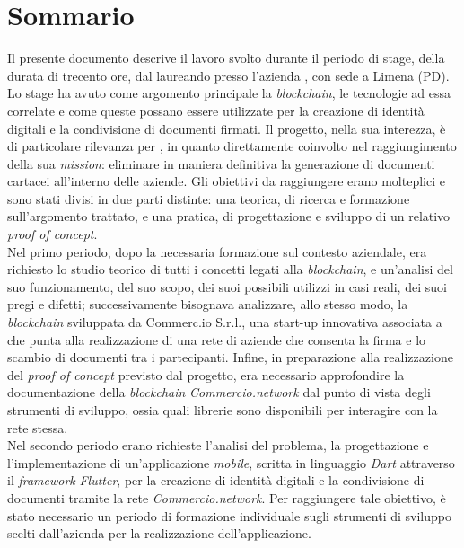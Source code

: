 
\cleardoublepage
{}
{}
\begingroup
\let\clearpage\relax
\let\cleardoublepage\relax
\let\cleardoublepage\relax

\chapter*{Sommario}

Il presente documento descrive il lavoro svolto durante il periodo di stage, della durata di trecento ore, dal laureando \myName{} presso l'azienda \myCompany{} \companyTitle{}, con sede a Limena (PD).\\
Lo stage ha avuto come argomento principale la \textit{blockchain}, le tecnologie ad essa correlate e come queste possano essere utilizzate per la creazione di identità digitali e la condivisione di documenti firmati. Il progetto, nella sua interezza, è di particolare rilevanza per \myCompany{} \companyTitle{}, in quanto direttamente coinvolto nel raggiungimento della sua \textit{mission}: eliminare in maniera definitiva la generazione di documenti cartacei all'interno delle aziende.
Gli obiettivi da raggiungere erano molteplici e sono stati divisi in due parti distinte: una teorica, di ricerca e formazione sull'argomento trattato, e una pratica, di progettazione e sviluppo di un relativo \textit{proof of concept}.\\
Nel primo periodo, dopo la necessaria formazione sul contesto aziendale, era richiesto lo studio teorico di tutti i concetti legati alla \textit{blockchain}, e un'analisi del suo funzionamento, del suo scopo, dei suoi possibili utilizzi in casi reali, dei suoi pregi e difetti; successivamente bisognava analizzare, allo stesso modo, la \textit{blockchain} sviluppata da Commerc.io S.r.l., una start-up innovativa associata a \myCompany{} \companyTitle{} che punta alla realizzazione di una rete di aziende che consenta la firma e lo scambio di documenti tra i partecipanti. Infine, in preparazione alla realizzazione del \textit{proof of concept} previsto dal progetto, era necessario approfondire la documentazione della \textit{blockchain} \textit{Commercio.network} dal punto di vista degli strumenti di sviluppo, ossia quali librerie sono disponibili per interagire con la rete stessa.\\
Nel secondo periodo erano richieste l'analisi del problema, la progettazione e l'implementazione di un'applicazione \textit{mobile}, scritta in linguaggio \textit{Dart} attraverso il \textit{framework} \textit{Flutter}, per la creazione di identità digitali e la condivisione di documenti tramite la rete \textit{Commercio.network}. Per raggiungere tale obiettivo, è stato necessario un periodo di formazione individuale sugli strumenti di sviluppo scelti dall'azienda per la realizzazione dell'applicazione.

%
%

\endgroup			

\vfill

